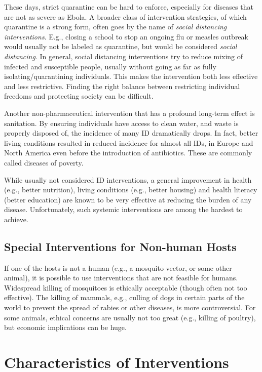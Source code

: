 \documentclass[
]{book}
\begin{document}
These days, strict quarantine can be hard to enforce, especially for diseases that are not as severe as Ebola. A broader class of intervention strategies, of which quarantine is a strong form, often goes by the name of \emph{social distancing interventions}. E.g., closing a school to stop an ongoing flu or measles outbreak would usually not be labeled as quarantine, but would be considered \emph{social distancing}. In general, social distancing interventions try to reduce mixing of infected and susceptible people, usually without going as far as fully isolating/quarantining individuals. This makes the intervention both less effective and less restrictive. Finding the right balance between restricting individual freedoms and protecting society can be difficult.

Another non-pharmaceutical intervention that has a profound long-term effect is sanitation. By ensuring individuals have access to clean water, and waste is properly disposed of, the incidence of many ID dramatically drops. In fact, better living conditions resulted in reduced incidence for almost all IDs, in Europe and North America even before the introduction of antibiotics. These are commonly called diseases of poverty.

While usually not considered ID interventions, a general improvement in health (e.g., better nutrition), living conditions (e.g., better housing) and health literacy (better education) are known to be very effective at reducing the burden of any disease. Unfortunately, such systemic interventions are among the hardest to achieve.

\hypertarget{special-interventions-for-non-human-hosts}{%
\subsection{Special Interventions for Non-human Hosts}\label{special-interventions-for-non-human-hosts}}

If one of the hosts is not a human (e.g., a mosquito vector, or some other animal), it is possible to use interventions that are not feasible for humans. Widespread killing of mosquitoes is ethically acceptable (though often not too effective). The killing of mammals, e.g., culling of dogs in certain parts of the world to prevent the spread of rabies or other diseases, is more controversial. For some animals, ethical concerns are usually not too great (e.g., killing of poultry), but economic implications can be huge.

\hypertarget{characteristics-of-interventions}{%
\section{Characteristics of Interventions}\label{characteristics-of-interventions}}
\end{document}
